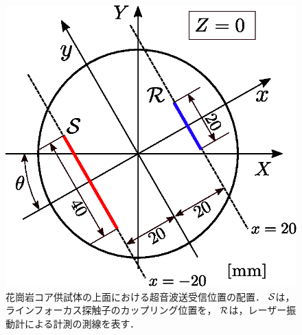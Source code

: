 \begin{figure}[h]
	\begin{center}
	\includegraphics[width=0.5\linewidth]{Figs/fig4.eps} 
	\end{center}
	\caption{
		花崗岩コア供試体の上面における超音波送受信位置の配置．
		${\cal S}$は，ラインフォーカス探触子のカップリング位置を，
		${\cal R}$は，レーザー振動計による計測の測線を表す．
	} 
	\label{fig:fig4}
\end{figure}

